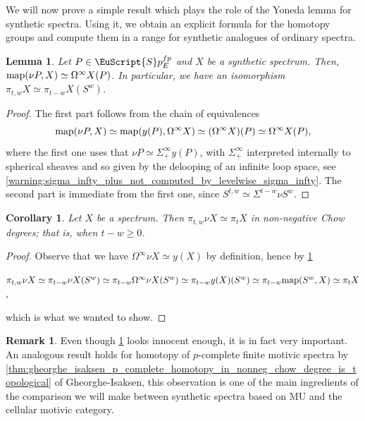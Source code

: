 \documentclass[oneside,a4paper]{amsart}
\newcommand{\euscr}[1]{\EuScript{#1}} %
\newcommand{\map}{\textnormal{map}} %
\newcommand{\MU}{\mathrm{MU}} %
\newcommand{\spectra}{\euscr{S}p} %
\newcommand{\sigmainfty}{\Sigma^{\infty}_{+}} %
\newcommand{\omegainfty}{\Omega^{\infty}} %
\theoremstyle{plain}
\newtheorem{lemma}[thm]{Lemma}
\newtheorem{cor}[thm]{Corollary}
\theoremstyle{definition}
\newtheorem{rem}[thm]{Remark}
\theoremstyle{remark}
\begin{document}
We will now prove a simple result which plays the role of the Yoneda lemma for synthetic spectra. Using it, we obtain an explicit formula for the homotopy groups and compute them in a range for synthetic analogues of ordinary spectra. 

\begin{lemma}
\label{lemma:yoneda_lemma_for_synthetic_spectra_and_explicit_formula_for_homotopy_groups}
Let $P \in \spectra_{E}^{fp}$ and $X$ be a synthetic spectrum. Then, $\map(\nu P, X) \simeq \Omega^{\infty}X(P)$. In particular, we have an isomorphism $\pi_{t, w}X \simeq \pi_{t-w} X(S^{w})$.
\end{lemma}

\begin{proof}
The first part follows from the chain of equivalences
\[
\map(\nu P, X) \simeq \map(y(P), \Omega^{\infty} X) \simeq (\Omega^{\infty} X)(P) \simeq \Omega^{\infty}X(P),
\]
where the first one uses that $\nu P \simeq \sigmainfty y(P)$, with $\sigmainfty$ interpreted internally to spherical sheaves and so given by the delooping of an infinite loop space, see \cref{warning:sigma_infty_plus_not_computed_by_levelwise_sigma_infty}. The second part is immediate from the first one, since $S^{t, w} \simeq \Sigma^{t -w} \nu S^{w}$.
\end{proof}

\begin{cor}
\label{cor:homotopy_of_synthetic_analogues_in_non_negative_chow_degree}
Let $X$ be a spectrum. Then $\pi_{t, w} \nu X \simeq \pi_{t} X$ in non-negative Chow degrees; that is, when $t - w \geq 0$. 
\end{cor}

\begin{proof}
Observe that we have $\omegainfty \nu X \simeq y(X)$ by definition, hence by \cref{lemma:yoneda_lemma_for_synthetic_spectra_and_explicit_formula_for_homotopy_groups}

\begin{center}
$\pi_{t, w} \nu X \simeq \pi_{t-w} \nu X(S^{w}) \simeq \pi_{t-w} \omegainfty \nu X(S^{w}) \simeq \pi_{t-w} y(X)(S^{w}) \simeq \pi_{t-w} \map(S^{w}, X) \simeq \pi_{t}X$,
\end{center}
which is what we wanted to show. 
\end{proof}

\begin{rem}
Even though \cref{cor:homotopy_of_synthetic_analogues_in_non_negative_chow_degree} looks innocent enough, it is in fact very important. An analogous result holds for homotopy of $p$-complete finite motivic spectra by \cref{thm:gheorghe_isaksen_p_complete_homotopy_in_nonneg_chow_degree_is_topological} of Gheorghe-Isaksen, this observation is one of the main ingredients of the comparison we will make between synthetic spectra based on $\MU$ and the cellular motivic category. 
\end{rem}
\end{document}
